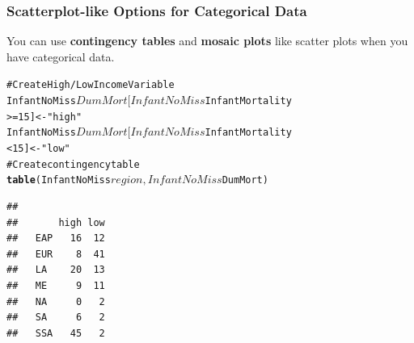 \documentclass{beamer}\usepackage{graphicx, color}
\makeatletter
\def\maxwidth{ %
  \ifdim\Gin@nat@width>\linewidth
    \linewidth
  \else
    \Gin@nat@width
  \fi
}
\newcommand{\hlfunctioncall}[1]{\textcolor[rgb]{0.501960784313725,0,0.329411764705882}{\textbf{#1}}}%
\newcommand{\hlstring}[1]{\textcolor[rgb]{0.6,0.6,1}{#1}}%
\newcommand{\hlcomment}[1]{\textcolor[rgb]{0.180392156862745,0.6,0.341176470588235}{#1}}%
\newenvironment{kframe}{%
 \def\at@end@of@kframe{}%
 \ifinner\ifhmode%
  \def\at@end@of@kframe{\end{minipage}}%
  \begin{minipage}{\columnwidth}%
 \fi\fi%
 \def\FrameCommand##1{\hskip\@totalleftmargin \hskip-\fboxsep
 \colorbox{shadecolor}{##1}\hskip-\fboxsep
     \hskip-\linewidth \hskip-\@totalleftmargin \hskip\columnwidth}%
 \MakeFramed {\advance\hsize-\width
   \@totalleftmargin\z@ \linewidth\hsize
   \@setminipage}}%
 {\par\unskip\endMakeFramed%
 \at@end@of@kframe}
\newenvironment{knitrout}{}{} %
\makeatother
\begin{document}

\begin{frame}[fragile]
  \frametitle{Scatterplot-like Options for Categorical Data}
  {\Large{You can use {\bf{contingency tables}} and {\bf{mosaic plots}} like scatter plots when you have categorical data.}}
\end{frame}  

\begin{frame}
\begin{knitrout}
\color{fgcolor}\begin{kframe}
\begin{alltt}
\hlcomment{# Create High/Low Income Variable}
InfantNoMiss$DumMort[InfantNoMiss$InfantMortality
                     >= 15] <- \hlstring{"high"}
InfantNoMiss$DumMort[InfantNoMiss$InfantMortality
                     < 15] <- \hlstring{"low"}
\hlcomment{# Create contingency table}
\hlfunctioncall{table}(InfantNoMiss$region, InfantNoMiss$DumMort)
\end{alltt}
\begin{verbatim}
##      
##       high low
##   EAP   16  12
##   EUR    8  41
##   LA    20  13
##   ME     9  11
##   NA     0   2
##   SA     6   2
##   SSA   45   2
\end{verbatim}
\end{kframe}
\end{knitrout}

\end{frame}
\end{document}
